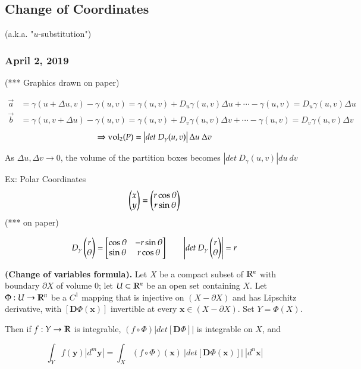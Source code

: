 \subsection{Change of Coordinates}
(a.k.a. "$u$-substitution")
\subsubsection*{April 2, 2019}

(*** Graphics drawn on paper)

\begin{align*}
	\vec{a} &= \gamma(u+\Delta u, v) - \gamma (u,v) = \gamma(u,v)+D_u \gamma(u,v)\Delta u + \cdots -\gamma (u,v)=D_u \gamma (u,v)\Delta u \\
	\vec{b} &=  \gamma(u, v+\Delta u) - \gamma (u,v) = \gamma(u,v)+D_v \gamma(u,v)\Delta v + \cdots -\gamma (u,v)=D_v \gamma (u,v)\Delta v
\end{align*}
\[\Rightarrow \mathrm{vol}_2 (P) = \left| det\ D_\gamma (u,v) \right| \Delta u\ \Delta v \]

As $\Delta u, \Delta v\to 0$, the volume of the partition boxes becomes $\left| det \ D_\gamma (u,v) \right| d u\ d v$

Ex: Polar Coordinates
\[\begin{pmatrix} x \\ y \end{pmatrix} = \begin{pmatrix} r\cos \theta \\ r\sin\theta \end{pmatrix}\]
(*** on paper)

\[D_\gamma \begin{pmatrix} r \\ \theta \end{pmatrix} = \begin{bmatrix}  \cos\theta & -r \sin\theta \\ \sin\theta & r\cos\theta \end{bmatrix} \qquad \left| det \ D_\gamma \begin{pmatrix} r\\ \theta \end{pmatrix} \right|=r\]

\begin{theorem}
	\textbf{(Change of variables formula).} Let $X$ be a compact subset of $\mathbb{R}^n$ with boundary $\partial X$ of volume 0; let $U\subset \mathbb{R}^n$ be an open set containing $X$. Let $\Phi : U \to \mathbb{R}^n$ be a $C^1$ mapping that is injective on $(X-\partial X)$ and has Lipschitz derivative, with $[\bm{D} \Phi (\bm{x}) ]$ invertible at every $\bm{x}\in (X-\partial X)$. Set $Y = \Phi(X)$. 
	
	Then if $f : Y\to \mathbb{R}$ is integrable, $(f\circ \Phi)|det[\bm{D}\Phi]|$ is integrable on $X$, and
	
	\begin{equation}
		\int_Y f(\bm{y})\left|d^m \bm{y}\right|=\int_X (f\circ \Phi)(\bm{x})\ \big|det[\bm{D}\Phi (\bm{x})]\big|\ \left|d^n \bm{x}\right|
	\end{equation}
\end{theorem}


